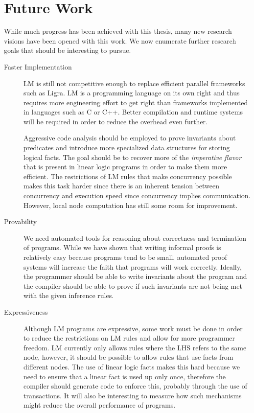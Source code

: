 \section{Future Work}

While much progress has been achieved with this thesis, many new research
visions have been opened with this work. We now enumerate further research goals
that should be interesting to pursue.

\begin{description}
   \item[Faster Implementation]

LM is still not competitive enough to replace efficient parallel frameworks such
as Ligra. LM is a programming language on its own right and thus requires more
engineering effort to get right than frameworks implemented in languages such as
C or C++. Better compilation and runtime systems will be required in order to
reduce the overhead even further.

Aggressive code analysis should be employed to prove invariants about predicates
and introduce more specialized data structures for storing logical facts. The
goal should be to recover more of the \emph{imperative flavor} that is present
in linear logic programs in order to make them more efficient. The restrictions
of LM rules that make concurrency possible makes this task harder since there is
an inherent tension between concurrency and execution speed since concurrency
implies communication. However, local node computation has still some room for
improvement.

\item[Provability]

We need automated tools for reasoning about correctness and termination of
programs. While we have shown that writing informal proofs is relatively easy
because programs tend to be small, automated proof systems will increase the
faith that programs will work correctly. Ideally, the programmer should be able
to write invariants about the program and the compiler should be able to prove
if such invariants are not being met with the given inference rules.

\item[Expressiveness]

Although LM programs are expressive, some work must be done in order to reduce
the restrictions on LM rules and allow for more programmer freedom.  LM
currently only allows rules where the LHS refers to the same node, however, it
should be possible to allow rules that use facts from different nodes. The use
of linear logic facts makes this hard because we need to ensure that a linear
fact is used up only once, therefore the compiler should generate code to
enforce this, probably through the use of transactions. It will also be
interesting to measure how such mechanisms might reduce the overall performance
of programs.


\end{description}
